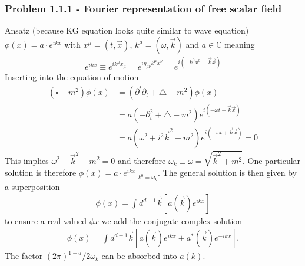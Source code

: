 \documentclass[10pt,a4paper]{article}
\theoremstyle{definition}
\begin{document}
\subsubsection{Problem 1.1.1 - Fourier representation of free scalar field}
Ansatz (because KG equation looks quite similar to wave equation) $\phi(x)=a\cdot e^{ikx}$ with $x^\mu=(t,\vec{x})$, $k^\mu=(\omega,\vec{k})$ and $a\in\mathbb{C}$ meaning 
\begin{align}
    e^{ikx}\equiv e^{ik^{\mu}x_{\mu}}=e^{i\eta_{\mu\nu}k^{\mu}x^{\nu}}=e^{i(-k^0x^0+\vec{k}\vec{x})}
\end{align}
Inserting into the equation of motion
\begin{align}
    (\square - m^2)\phi(x)&=(\partial^t\partial_t + \triangle - m^2)\phi(x)\\
    &=a(-\partial_t^2 + \triangle - m^2)e^{i(-\omega t+\vec{k}\vec{x})}\\
    &=a\left(\omega^2 + i^2\vec{k}^2 - m^2\right)e^{i(-\omega t+\vec{k}\vec{x})}=0 
\end{align}
This implies $\omega^2-\vec{k}^2-m^2=0$ and therefore $\omega_k\equiv\omega=\sqrt{\vec{k}^2+m^2}$. One particular solution is therefore $\phi(x)=a\cdot e^{ikx}|_{k^0=\omega_k}$. The general solution is then given by a superposition
\begin{align}
    \phi(x)=\int d^{d-1}\vec{k}\left[a(\vec{k})e^{ikx}\right]
\end{align}
to ensure a real valued $\phi{x}$ we add the conjugate complex solution
\begin{align}
    \phi(x)=\int d^{d-1}\vec{k}\left[a(\vec{k})e^{ikx} + a^*(\vec{k})e^{-ikx}\right].
\end{align}
The factor $(2\pi)^{1-d}/2\omega_k$ can be absorbed into $a(k)$.
\end{document}
